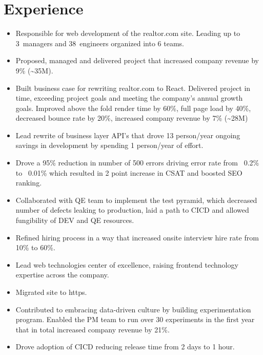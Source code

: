 \documentclass[11pt,a4paper,roman]{moderncv}       %
\begin{document}
\section{Experience}


\begin{itemize}
    \item Responsible for web development of the realtor.com site. Leading up to 3~managers and 38~engineers organized into 6 teams.  
    \item Proposed, managed and delivered project that increased company revenue by 9\% (\textasciitilde35M).
    \item Built business case for rewriting realtor.com to React. Delivered project in time, exceeding project goals and meeting the company's annual growth goals. Improved above the fold render time by 60\%, full page load by 40\%, decreased bounce rate by 20\%, increased company revenue by 7\% (\textasciitilde28M)
    \item Lead rewrite of business layer API's that drove 13 person/year ongoing savings in development by spending 1 person/year of effort.
    \item Drove a 95\% reduction in number of 500 errors driving error rate from ~0.2\% to ~0.01\% which resulted in 2 point increase in CSAT and boosted SEO ranking.
    \item Collaborated with QE team to implement the test pyramid, which decreased number of defects leaking to production, laid a path to CICD and allowed fungibility of DEV and QE resources.
    \item Refined hiring process in a way that increased onsite interview hire rate from 10\% to 60\%.
    \item Lead web technologies center of excellence, raising frontend technology expertise across the company.
    \item Migrated site to https.
    \item Contributed to embracing data-driven culture by building experimentation program. Enabled the PM team to run over 30 experiments in the first year that in total increased company revenue by 21\%.
    \item Drove adoption of CICD reducing release time from 2 days to 1 hour.



\end{itemize}
\end{document}
